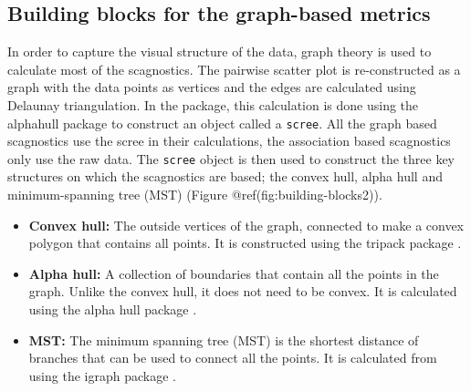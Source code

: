 \hypertarget{building-blocks-for-the-graph-based-metrics}{%
\subsection{Building blocks for the graph-based
metrics}\label{building-blocks-for-the-graph-based-metrics}}

In order to capture the visual structure of the data, graph theory is
used to calculate most of the scagnostics. The pairwise scatter plot is
re-constructed as a graph with the data points as vertices and the edges
are calculated using Delaunay triangulation. In the package, this
calculation is done using the alphahull package \citep{alphahull} to
construct an object called a \texttt{scree}. All the graph based
scagnostics use the scree in their calculations, the association based
scagnostics only use the raw data. The \texttt{scree} object is then
used to construct the three key structures on which the scagnostics are
based; the convex hull, alpha hull and minimum-spanning tree (MST)
(Figure @ref(fig:building-blocks2)).

\begin{itemize}
\item
  \textbf{Convex hull:} The outside vertices of the graph, connected to
  make a convex polygon that contains all points. It is constructed
  using the tripack package \citep{tripack}.
\item
  \textbf{Alpha hull:} A collection of boundaries that contain all the
  points in the graph. Unlike the convex hull, it does not need to be
  convex. It is calculated using the alpha hull package
  \citep{alphahull}.
\item
  \textbf{MST:} The minimum spanning tree (MST) is the shortest distance
  of branches that can be used to connect all the points. It is
  calculated from using the igraph package \citep{igraph}.
\end{itemize}

